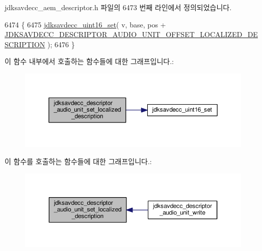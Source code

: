 jdksavdecc\+\_\+aem\+\_\+descriptor.\+h 파일의 6473 번째 라인에서 정의되었습니다.


\begin{DoxyCode}
6474 \{
6475     \hyperlink{group__endian_ga14b9eeadc05f94334096c127c955a60b}{jdksavdecc\_uint16\_set}( v, base, pos + 
      \hyperlink{group__descriptor__audio_ga6c4940527dd63344548acac9113cd6f2}{JDKSAVDECC\_DESCRIPTOR\_AUDIO\_UNIT\_OFFSET\_LOCALIZED\_DESCRIPTION}
       );
6476 \}
\end{DoxyCode}


이 함수 내부에서 호출하는 함수들에 대한 그래프입니다.\+:
\nopagebreak
\begin{figure}[H]
\begin{center}
\leavevmode
\includegraphics[width=350pt]{group__descriptor__audio_ga4b5dae705b5360c134eaf2214fdb27d9_cgraph}
\end{center}
\end{figure}




이 함수를 호출하는 함수들에 대한 그래프입니다.\+:
\nopagebreak
\begin{figure}[H]
\begin{center}
\leavevmode
\includegraphics[width=350pt]{group__descriptor__audio_ga4b5dae705b5360c134eaf2214fdb27d9_icgraph}
\end{center}
\end{figure}


